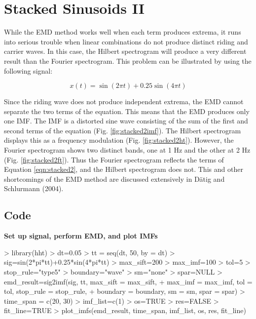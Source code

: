 \documentclass[12pt]{article}
\begin{document}
\FloatBarrier


\section{Stacked Sinusoids II}

While the EMD method works well when each term produces extrema, it runs into serious trouble when linear combinations do not produce distinct riding and carrier waves.
In this case, the Hilbert spectrogram will produce a very different result than the Fourier spectrogram.
This problem can be illustrated by using the following signal:

\begin{equation}
\label{eqn:stacked2}
x(t) = \sin(2 \pi t) + 0.25\sin(4 \pi t)
\end{equation}

Since the riding wave does not produce independent extrema, the EMD cannot separate the two terms of the equation.
This means that the EMD produces only one IMF.
The IMF is a distorted sine wave consisting of the sum of the first and second terms of the equation (Fig. \ref{fig:stacked2imf}).
The Hilbert spectrogram displays this as a frequency modulation (Fig. \ref{fig:stacked2ht}).
However, the Fourier spectrogram shows two distinct bands, one at 1 Hz and the other at 2 Hz (Fig. \ref{fig:stacked2ft}).
Thus the Fourier spectrogram reflects the terms of Equation \ref{eqn:stacked2}, and the Hilbert spectrogram does not.
This and other shortcomings of the EMD method are discussed extensively in D\"{a}tig and Schlurmann (2004).

\subsection{Code}

\textbf{Set up signal, perform EMD, and plot IMFs}
\begin{Schunk}
\begin{Sinput}
> library(hht)
> dt=0.05
> tt = seq(dt, 50, by = dt)
> sig=sin(2*pi*tt)+0.25*sin(4*pi*tt)
> max_sift=200
> max_imf=100
> tol=5
> stop_rule="type5"
> boundary="wave"
> sm="none"
> spar=NULL
> emd_result=sig2imf(sig, tt, max_sift = max_sift,
+     max_imf = max_imf, tol = tol, stop_rule = stop_rule,
+     boundary = boundary, sm = sm, spar = spar)
> time_span = c(20, 30)
> imf_list=c(1)
> os=TRUE
> res=FALSE
> fit_line=TRUE
> plot_imfs(emd_result, time_span, imf_list, os, res, fit_line)
\end{Sinput}
\end{Schunk}
\end{document}
